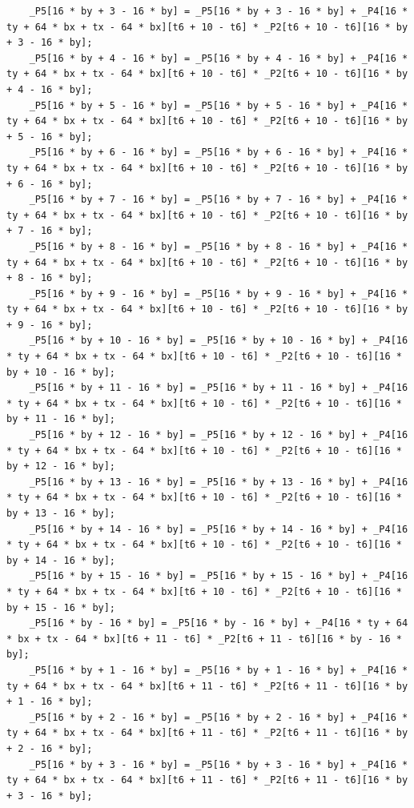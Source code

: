\documentclass[msthesis,justified,copyright,final,numbers,sort&compress,
gsmodern,amstex,natbib]{uothesis}
\begin{document}
\begin{lstlisting}
    _P5[16 * by + 3 - 16 * by] = _P5[16 * by + 3 - 16 * by] + _P4[16 * ty + 64 * bx + tx - 64 * bx][t6 + 10 - t6] * _P2[t6 + 10 - t6][16 * by + 3 - 16 * by];
    _P5[16 * by + 4 - 16 * by] = _P5[16 * by + 4 - 16 * by] + _P4[16 * ty + 64 * bx + tx - 64 * bx][t6 + 10 - t6] * _P2[t6 + 10 - t6][16 * by + 4 - 16 * by];
    _P5[16 * by + 5 - 16 * by] = _P5[16 * by + 5 - 16 * by] + _P4[16 * ty + 64 * bx + tx - 64 * bx][t6 + 10 - t6] * _P2[t6 + 10 - t6][16 * by + 5 - 16 * by];
    _P5[16 * by + 6 - 16 * by] = _P5[16 * by + 6 - 16 * by] + _P4[16 * ty + 64 * bx + tx - 64 * bx][t6 + 10 - t6] * _P2[t6 + 10 - t6][16 * by + 6 - 16 * by];
    _P5[16 * by + 7 - 16 * by] = _P5[16 * by + 7 - 16 * by] + _P4[16 * ty + 64 * bx + tx - 64 * bx][t6 + 10 - t6] * _P2[t6 + 10 - t6][16 * by + 7 - 16 * by];
    _P5[16 * by + 8 - 16 * by] = _P5[16 * by + 8 - 16 * by] + _P4[16 * ty + 64 * bx + tx - 64 * bx][t6 + 10 - t6] * _P2[t6 + 10 - t6][16 * by + 8 - 16 * by];
    _P5[16 * by + 9 - 16 * by] = _P5[16 * by + 9 - 16 * by] + _P4[16 * ty + 64 * bx + tx - 64 * bx][t6 + 10 - t6] * _P2[t6 + 10 - t6][16 * by + 9 - 16 * by];
    _P5[16 * by + 10 - 16 * by] = _P5[16 * by + 10 - 16 * by] + _P4[16 * ty + 64 * bx + tx - 64 * bx][t6 + 10 - t6] * _P2[t6 + 10 - t6][16 * by + 10 - 16 * by];
    _P5[16 * by + 11 - 16 * by] = _P5[16 * by + 11 - 16 * by] + _P4[16 * ty + 64 * bx + tx - 64 * bx][t6 + 10 - t6] * _P2[t6 + 10 - t6][16 * by + 11 - 16 * by];
    _P5[16 * by + 12 - 16 * by] = _P5[16 * by + 12 - 16 * by] + _P4[16 * ty + 64 * bx + tx - 64 * bx][t6 + 10 - t6] * _P2[t6 + 10 - t6][16 * by + 12 - 16 * by];
    _P5[16 * by + 13 - 16 * by] = _P5[16 * by + 13 - 16 * by] + _P4[16 * ty + 64 * bx + tx - 64 * bx][t6 + 10 - t6] * _P2[t6 + 10 - t6][16 * by + 13 - 16 * by];
    _P5[16 * by + 14 - 16 * by] = _P5[16 * by + 14 - 16 * by] + _P4[16 * ty + 64 * bx + tx - 64 * bx][t6 + 10 - t6] * _P2[t6 + 10 - t6][16 * by + 14 - 16 * by];
    _P5[16 * by + 15 - 16 * by] = _P5[16 * by + 15 - 16 * by] + _P4[16 * ty + 64 * bx + tx - 64 * bx][t6 + 10 - t6] * _P2[t6 + 10 - t6][16 * by + 15 - 16 * by];
    _P5[16 * by - 16 * by] = _P5[16 * by - 16 * by] + _P4[16 * ty + 64 * bx + tx - 64 * bx][t6 + 11 - t6] * _P2[t6 + 11 - t6][16 * by - 16 * by];
    _P5[16 * by + 1 - 16 * by] = _P5[16 * by + 1 - 16 * by] + _P4[16 * ty + 64 * bx + tx - 64 * bx][t6 + 11 - t6] * _P2[t6 + 11 - t6][16 * by + 1 - 16 * by];
    _P5[16 * by + 2 - 16 * by] = _P5[16 * by + 2 - 16 * by] + _P4[16 * ty + 64 * bx + tx - 64 * bx][t6 + 11 - t6] * _P2[t6 + 11 - t6][16 * by + 2 - 16 * by];
    _P5[16 * by + 3 - 16 * by] = _P5[16 * by + 3 - 16 * by] + _P4[16 * ty + 64 * bx + tx - 64 * bx][t6 + 11 - t6] * _P2[t6 + 11 - t6][16 * by + 3 - 16 * by];

\end{lstlisting}
\end{document}

